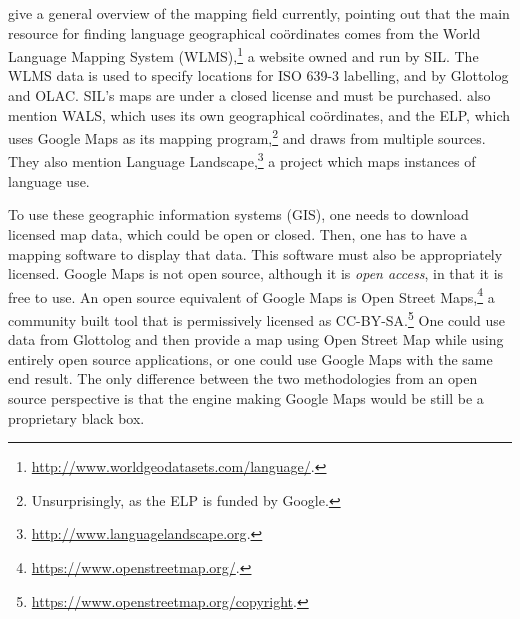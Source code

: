 \citet{gawne2016mapmaking} give a general overview of the mapping field currently, pointing out that the main resource for finding language geographical co\"ordinates comes from the World Language Mapping System (WLMS),\footnote{\href{http://www.worldgeodatasets.com/language/.}{http://www.worldgeodatasets.com/language/}. } a website owned and run by SIL. The WLMS data is used to specify locations for ISO 639-3 labelling, and by Glottolog and OLAC. SIL's maps are under a closed license and must be purchased. \citet{gawne2016mapmaking} also mention WALS, which uses its own geographical co\"ordinates, and the ELP, which uses Google Maps as its mapping program,\footnote{Unsurprisingly, as the ELP is funded by Google.} and draws from multiple sources. They also mention Language Landscape,\footnote{\href{http://www.languagelandscape.org/}{http://www.languagelandscape.org}. } a project which maps instances of language use.

To use these geographic information systems (GIS), one needs to download licensed map data, which could be open or closed. Then, one has to have a mapping software to display that data. This software must also be appropriately licensed. Google Maps is not open source, although it is {\it open access}, in that it is free to use. An open source equivalent of Google Maps is Open Street Maps,\footnote{\href{https://www.openstreetmap.org/}{https://www.openstreetmap.org/}. } a community built tool that is permissively licensed as CC-BY-SA.\footnote{\href{https://www.openstreetmap.org/copyright}{https://www.openstreetmap.org/copyright}. } One could use data from Glottolog and then provide a map using Open Street Map while using entirely open source applications, or one could use Google Maps with the same end result. The only difference between the two methodologies from an open source perspective is that the engine making Google Maps would be still be a proprietary black box.

